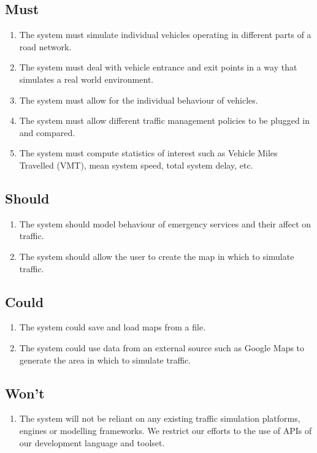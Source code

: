 \documentclass[11pt,a4paper]{article}
\begin{document}
\subsection{Must}
\label{section:must}
\begin{enumerate}[itemsep=-1ex]
  \item The system must simulate individual vehicles operating in different parts of a road network.
  \item The system must deal with vehicle entrance and exit points in a way that simulates a real world environment.
  \item The system must allow for the individual behaviour of vehicles.
  \item The system must allow different traffic management policies to be plugged in and compared.
  \item The system must compute statistics of interest such as Vehicle Miles Travelled (VMT), mean system speed, total system delay, etc. 
\end{enumerate}

\subsection{Should}
\begin{enumerate}[itemsep=-1ex]
  \item The system should model behaviour of emergency services and their affect on traffic.
  \item The system should allow the user to create the map in which to simulate traffic.
\end{enumerate}

\subsection{Could}
\begin{enumerate}[itemsep=-1ex]
  \item The system could save and load maps from a file.
  \item The system could use data from an external source such as Google Maps to generate the area in which to simulate traffic.
\end{enumerate}

\subsection{Won't}
\begin{enumerate}[itemsep=-1ex]
  \item The system will not be reliant on any existing traffic simulation platforms, engines or modelling frameworks.  We restrict our efforts to the use of APIs of our development language and toolset.
\end{enumerate}
\end{document}
